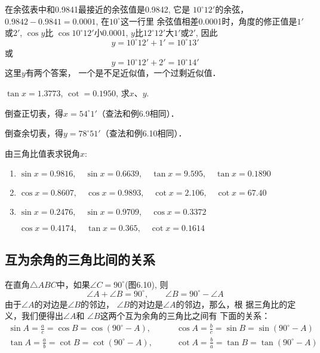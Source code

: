 \begin{solution}
    在余弦表中和0.9841最接近的余弦值是0.9842, 它是
$10^{\circ}12'$的余弦，$0.9842-0.9841=0.0001$, 在$10^{\circ}$这一行里
余弦值相差0.0001时，角度的修正值是$1'$或$2'$, $\cos y$比
$\cos10^{\circ}12'$小0.0001, $y$比$12^{\circ}12'$大$1'$或$2'$, 因此
\[y=10^{\circ}12'+1'=10^{\circ}13'\]
或\[y=10^{\circ}12'+2'=10^{\circ}14'\]
这里$y$有两个答案，
一个是不足近似值，一个过剩近似值．
\end{solution}

\begin{example}
    $\tan x=1.3773$, $\cot=0.1950$, 求$x$、$y$.
\end{example}

\begin{solution}
倒查正切表，得$x=54^{\circ}1'$（查法和例6.9相同）．

倒查余切表，得$y=78^{\circ}51'$（查法和例6.10相同）．
\end{solution}

\begin{ex}
    由三角比值表求锐角$x$:
\begin{enumerate}
    \item $\sin x=0.9816,\quad
    \sin x=0.6639,\quad
    \tan x=9.595,\quad
    \tan x=0.1890$
    \item $\cos x=0.8607,\quad
    \cos x=0.9893,\quad
    \cot x=2.106,\quad
    \cot x=67.40$
    \item $\sin x=0.2476,\quad
    \sin x=0.9709,\quad
    \cos x=0.3372$
    
    $
    \cos x=0.4174,\quad
    \tan x=0.365,\quad
    \cot x=0.1614$
\end{enumerate}
\end{ex}

\subsection{互为余角的三角比间的关系}
\begin{figure}[htp]
    \centering
{}
    \caption{}
\end{figure}

在直角$\triangle ABC$中，如果$\angle C=90^{\circ}$(图6.10), 则
\[\angle A+\angle B=90^{\circ},\qquad \angle B=90^{\circ}-\angle A\]
由于$\angle A$的对边是$\angle B$的邻边，
$\angle B$的对边是$\angle A$的邻边，那么，根
据三角比的定义，我们便得出$\angle A$和
$\angle B$这两个互为余角的三角比之间有
下面的关系：
\[\begin{split}
    \sin A=\frac{a}{c}=\cos B=\cos(90^{\circ}-A),&\qquad \cos A=\frac{b}{c}=\sin B=\sin(90^{\circ}-A)\\
    \tan A=\frac{a}{b}=\cot B=\cot(90^{\circ}-A),&\qquad \cot A=\frac{b}{a}=\tan B=\tan(90^{\circ}-A)\\
\end{split}\]

